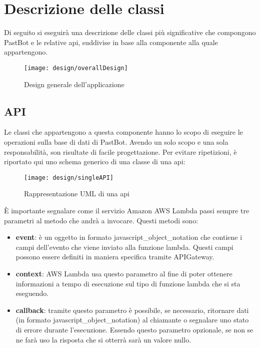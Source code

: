 \section{Descrizione delle classi}
Di seguito si eseguirà una descrizione delle classi più significative che
compongono PastBot e le relative \gls{api}, suddivise in base alla componente
alla quale appartengono.

\begin{figure}[H]
  \centering
  \texttt{[image: design/overallDesign]}
  \caption{Design generale dell'applicazione}
\end{figure}

\subsection{API}
\label{design:api}

Le classi che appartengono a questa componente hanno lo scopo di eseguire le
operazioni sulla base di dati di PastBot. Avendo un solo scopo e una sola
responsabilità, son risultate di facile progettazione.
Per evitare ripetizioni, è riportato qui uno schema generico di una classe
di una \gls{api}:

\begin{figure}[H]
  \centering
  \texttt{[image: design/singleAPI]}
  \caption{Rappresentazione UML di una \gls{api}}
\end{figure}

\label{design:api:params}
È importante segnalare come il servizio Amazon AWS Lambda passi sempre tre
parametri al metodo che andrà a invocare. Questi metodi sono:
\begin{itemize}
  \item \textbf{event}: è un oggetto in formato
\gls{javascript_object_notation} che contiene i campi dell'evento che viene
inviato alla funzione lambda. Questi campi possono essere definiti in maniera
specifica tramite APIGateway.
  \item \textbf{context}: AWS Lambda usa questo parametro al fine di poter
ottenere informazioni a tempo di esecuzione sul tipo di funzione lambda che si
sta eseguendo.
  \item \textbf{callback}: tramite questo parametro è possibile, se necessario,
ritornare dati (in formato \gls{javascript_object_notation}) al chiamante o
segnalare uno stato di errore durante l'esecuzione. Essendo questo parametro
opzionale, se non se ne farà uso la risposta che si otterrà sarà un valore
nullo.
\end{itemize}

